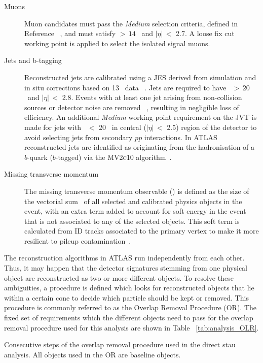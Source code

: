 \begin{description}
	\item[Muons] Muon candidates must pass the \textit{Medium} selection criteria, defined in Reference ~\cite{ATLASMuonRecoRun2}, and must satisfy \pt $>\,14$ \gev\ and $|\eta|\,<$ 2.7. A loose fix cut working point is applied to select the isolated signal muons. 
	\item[Jets and b-tagging] Reconstructed jets are calibrated using a \ac{JES} derived from simulation and in situ corrections based on 13 \tev\ data ~\cite{ATL-PHYS-PUB-2015-015,ATLAS-CONF-2015-037}. Jets are required to have \pt\ $>\,20$ \gev\ and $|\eta|\,<$ 2.8. Events with at least one jet arising from non-collision sources or detector noise are removed ~\cite{ATLAS-CONF-2015-029}, resulting in negligible loss of efficiency. An additional \textit{Medium} working point requirement on the \ac{JVT} is made for jets with \pt\ $<$ 20 \gev\ in central  ($|\eta|\,<$ 2.5) region of the detector to avoid selecting jets from secondary $pp$ interactions.
	In \ac{ATLAS} reconstructed jets are identified as originating from the hadronisation of a $b$-quark ($b$-tagged) via the \textsc{MV2c10} algorithm~\cite{Aaboud_2018}. 
	\item[Missing transverse momentum] The missing transverse momentum observable (\met) is defined as the size of the vectorial sum \pt\ of all selected and calibrated physics objects in the event, with an extra term added to account for soft energy in the event that is not associated to any of the selected objects. This soft term is calculated from \ac{ID} tracks associated to the primary vertex to make it more resilient to pileup contamination~\cite{ATLASMet2015,ATLASMet2012}.
	\end{description}
	
	The reconstruction algorithms in \ac{ATLAS} run independently from each other. Thus, it may happen that the detector signatures stemming from one physical object are reconstructed as two or more different objects. 
	To resolve these ambiguities, a procedure is defined which looks for reconstructed objects that lie within a certain cone to decide which particle should be kept or removed. This procedure is commonly referred to as the Overlap Removal Procedure (\ac{OR}). 
	The fixed set of requirements which the different objects need to pass for the overlap removal procedure used for this analysis are shown in Table ~\ref{tab:analysis_OLR}.
	
	\begin{table}[!hbt]
	\centering
	\caption{Consecutive steps of the overlap removal procedure used in the direct stau analysis. All objects used in the \ac{OR} are baseline objects.}
		
	\label{tab:analysis_OLR}
	\end{table}
	
